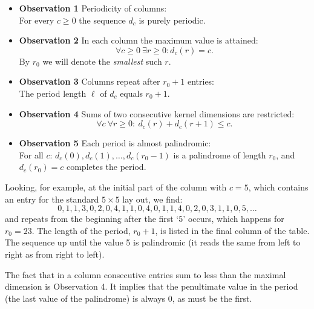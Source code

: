 \begin{itemize}
\item{\bf Observation 1} Periodicity of columns:\\
For every $c\geq 0$ the sequence $d_c$ is purely periodic. %
\item{\bf Observation 2} In each column the maximum value is attained:
$$\forall c\geq 0\ \exists r\geq 0: d_c(r)=c.$$
By $r_0$ we will denote the {\em smallest} such $r$.
\item{\bf Observation 3} Columns repeat after $r_0+1$ entries:\\
The period length $\ell$ of $d_c$ equals $r_0+1$.
\item{\bf Observation 4} Sums of two consecutive kernel dimensions are restricted:\\
$$\forall c\ \forall r\geq 0:\ d_c(r)+d_c(r+1)\leq c.$$
\item{\bf Observation 5} Each period is almost palindromic:\\
For all $c$: $d_c(0), d_c(1), \ldots, d_c(r_0-1)$
is a palindrome of length $r_0$, and $d_c(r_0)=c$ completes the period.
\end{itemize}
\noindent
Looking, for example, at the initial part of
the column with $c=5$, which contains an entry for
the standard $5\times 5$ lay out, we find:
$$0,1,1,3,0,2,0,4,1,1,0,4,0,1,1,4,0,2,0,3,1,1,0,5,\ldots$$
and repeats from the beginning after the first `$5$' occurs, which
happens for $r_0=23$. The length of the period, $r_0+1$,
is listed in the final column of the table.
The sequence up until the value 5 is palindromic 
(it reads the same from left to right as from right to left).

The fact that in a column consecutive entries sum to less than the
maximal dimension is Observation 4. It implies
that the penultimate value in the period (the last value of the
palindrome) is always 0, as must be the first.

